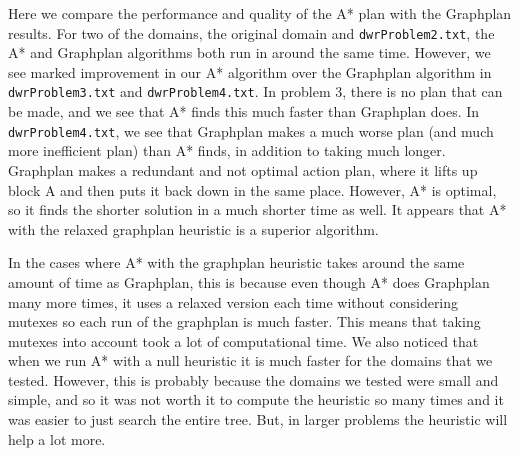 \documentclass[12pt]{article}
\begin{document}
Here we compare the performance and quality of the A* plan with the Graphplan results. For two of the domains, the original domain and \verb|dwrProblem2.txt|, the A* and Graphplan algorithms both run in around the same time. However, we see marked improvement in our A* algorithm over the Graphplan algorithm in \verb|dwrProblem3.txt| and \verb|dwrProblem4.txt|. In problem 3, there is no plan that can be made, and we see that A* finds this much faster than Graphplan does. In \verb|dwrProblem4.txt|, we see that Graphplan makes a much worse plan (and much more inefficient plan) than A* finds, in addition to taking much longer. Graphplan makes a redundant and not optimal action plan, where it lifts up block A and then puts it back down in the same place. However, A* is optimal, so it finds the shorter solution in a much shorter time as well. It appears that A* with the relaxed graphplan heuristic is a superior algorithm. 

In the cases where A* with the graphplan heuristic takes around the same amount of time as Graphplan, this is because even though A* does Graphplan many more times, it uses a relaxed version each time without considering mutexes so each run of the graphplan is much faster. This means that taking mutexes into account took a lot of computational time. We also noticed that when we run A* with a null heuristic it is much faster for the domains that we tested. However, this is probably because the domains we tested were small and simple, and so it was not worth it to compute the heuristic so many times and it was easier to just search the entire tree. But, in larger problems the heuristic will help a lot more.
\end{document}
